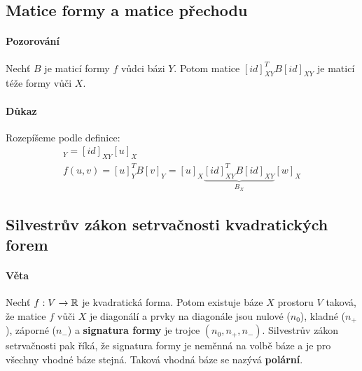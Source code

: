 \documentclass[a4paper,10pt]{article}
\begin{document}
\subsection{Matice formy a matice přechodu}
\setcounter{equation}{0}
\paragraph{Pozorování}
Nechť $B$ je maticí formy $f$ vůdci bázi $Y$. Potom matice $[id]_{XY}^T B [id]_{XY}$
je maticí téže formy vůči $X$.
\paragraph{Důkaz}
Rozepíšeme podle definice:
\begin{align}
	[u]_Y = [id]_{XY} [u]_X \\
	f(u,v) = [u]_Y^T B[v]_Y = [u]_X \underbrace{[id]_{XY}^T B [id]_{XY}}_{B_X} [w]_X
\end{align}

\subsection{Silvestrův zákon setrvačnosti kvadratických forem}
\setcounter{equation}{0}
\paragraph{Věta}
Nechť $f: V \to \mathbb{R}$ je kvadratická forma. Potom existuje báze $X$ prostoru $V$ taková,
že matice $f$ vůči $X$ je diagonálí a prvky na diagonále jsou nulové ($n_0$), kladné
($n_+$), záporné ($n_-$) a \textbf{signatura formy} je trojce $(n_0, n_+, n_-)$.
Silvestrův zákon setrvačnosti pak říká, že signatura formy je neměnná na volbě
báze a je pro všechny vhodné báze stejná. Taková vhodná báze se nazývá \textbf{polární}.
\end{document}
